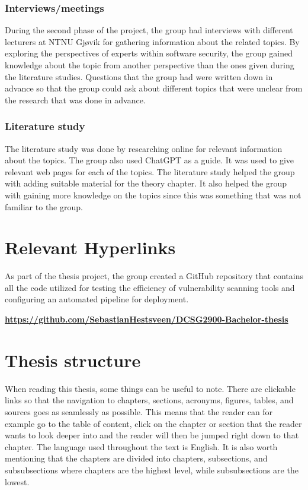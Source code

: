 \subsubsection{Interviews/meetings}
During the second phase of the project, the group had interviews with different lecturers at NTNU Gjøvik for gathering information about the related topics. By exploring the perspectives of experts within software security, the group gained knowledge about the topic from another perspective than the ones given during the literature studies. Questions that the group had were written down in advance so that the group could ask about different topics that were unclear from the research that was done in advance.   

\subsubsection{Literature study}
The literature study was done by researching online for relevant information about the topics. The group also used ChatGPT as a guide. It was used to give relevant web pages for each of the topics. The literature study helped the group with adding suitable material for the theory chapter. It also helped the group with gaining more knowledge on the topics since this was something that was not familiar to the group. 

\section{Relevant Hyperlinks}
As part of the thesis project, the group created a GitHub repository that contains all the code utilized for testing the efficiency of vulnerability scanning tools and configuring an automated pipeline for deployment. 

\href{https://github.com/SebastianHestsveen/DCSG2900-Bachelor-thesis}{\textbf{https://github.com/SebastianHestsveen/DCSG2900-Bachelor-thesis}}

\section{Thesis structure}
When reading this thesis, some things can be useful to note. There are clickable links so that the navigation to chapters, sections, acronyms, figures, tables, and sources goes as seamlessly as possible. This means that the reader can for example go to the table of content, click on the chapter or section that the reader wants to look deeper into and the reader will then be jumped right down to that chapter. The language used throughout the text is English. It is also worth mentioning that the chapters are divided into chapters, subsections, and subsubsections where chapters are the highest level, while subsubsections are the lowest. 
